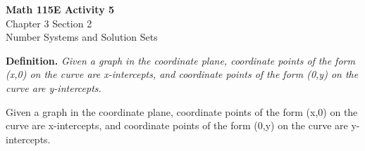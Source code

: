\documentclass{article}
\begin{document}
\begin{center}
    \Large \textbf{Math 115E Activity 5} \\
    \vspace{0.2cm}
    \normalsize Chapter 3 Section 2 \\
    \normalsize Number Systems and Solution Sets
\end{center}
\vspace{1cm} %

\begin{tcolorbox}[
    width=\linewidth,
    colframe=black,         %
    colback=white,          %
    boxrule=0.5pt,          %
    left=1mm, right=1mm,    %
    top=1mm, bottom=1mm,    %
    arc=2mm                 %
]
\textbf{Definition.} \textit{Given a graph in the coordinate plane, coordinate points of the form (x,0) on the curve are x-intercepts, and coordinate points of the form (0,y) on the curve are y-intercepts.}
\end{tcolorbox}

\begin{theo}
Given a graph in the coordinate plane, 
coordinate points of the form (x,0) on the curve are x-intercepts,
 and coordinate points of the form (0,y) on the curve are y-intercepts.
\end{theo}
\end{document}
